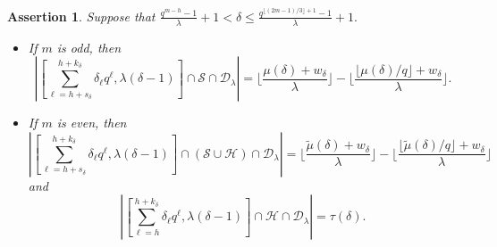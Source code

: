 \documentclass[journal,onecolumn]{IEEEtran}
\newtheorem{assertion}{Assertion}
\begin{document}
\begin{assertion}\label{as1}
Suppose that    $ \frac{q^{m-h}-1}{\lambda}+1< \delta\leq  \frac{q^{\lfloor (2m-1)/3\rfloor+1}-1}{\lambda}+1.$ 
\begin{itemize}
\item 
If $m$ is odd, then 
\begin{equation}\label{as1e0} 
\left|\left[\sum\limits_{\ell=h+s_{\delta}}^{h+k_{\delta}}\delta_{\ell}q^{\ell}, \lambda(\delta-1)\right]\cap \mathcal{S}\cap \mathcal{D}_{\lambda}\right|=\lfloor \frac{\mu(\delta)+w_{\delta}}{\lambda}\rfloor -\lfloor \frac{\lfloor \mu(\delta)/q\rfloor+w_{\delta}}{\lambda}\rfloor. 
\end{equation}
\item If $m$ is even, then \begin{equation}\label{as1e0-1} 
\left|\left[\sum\limits_{\ell=h+s_{\delta}}^{h+k_{\delta}}\delta_{\ell}q^{\ell}, \lambda(\delta-1)\right]\cap (\mathcal{S}\cup \mathcal{H})\cap \mathcal{D}_{\lambda}\right|=  \lfloor \frac{\widetilde{\mu}(\delta)+w_{\delta}}{\lambda}\rfloor-\lfloor \frac{\lfloor\widetilde{\mu}(\delta)/q\rfloor+w_{\delta}}{\lambda}\rfloor
\end{equation}
and 
\begin{equation}\label{as1e0-2} 
\left|\left[\sum\limits_{\ell=h}^{h+k_{\delta}}\delta_{\ell}q^{\ell}, \lambda(\delta-1)\right]\cap  \mathcal{H}\cap \mathcal{D}_{\lambda}\right|=\tau(\delta).
\end{equation}
\end{itemize}
\end{assertion}
\end{document}
